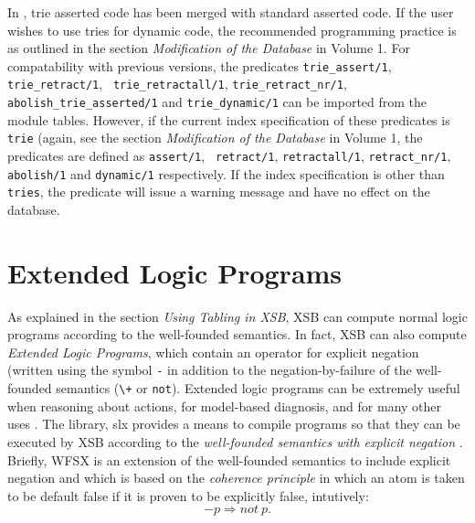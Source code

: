 In \version, trie asserted code has been merged with standard asserted
code.  If the user wishes to use tries for dynamic code, the
recommended programming practice is as outlined in the section {\it
Modification of the Database} in Volume 1.
For compatability with previous versions, the
predicates {\tt trie\_assert/1}, {\tt trie\_retract/1}, {\tt
trie\_retractall/1}, {\tt trie\_retract\_nr/1}, {\tt
abolish\_trie\_asserted/1} and {\tt trie\_dynamic/1} can be imported
from the module {\sf tables}.  However, if the current index
specification of these predicates is {\tt trie} (again, see the
section {\it Modification of the Database} in Volume 1, the predicates
are defined as {\tt assert/1}, {\tt 
retract/1}, {\tt retractall/1}, {\tt retract\_nr/1}, {\tt abolish/1}
and {\tt dynamic/1} respectively.  If the index specification is other
than {\tt tries}, the predicate will issue a warning message and have
no effect on the database.

\section{Extended Logic Programs}  \label{library_utilities:wfsx}
As explained in the section {\it Using Tabling in XSB}, XSB can
compute normal logic programs according to the well-founded semantics.
In fact, XSB 
can also compute {\em Extended Logic Programs}, which contain an
operator for explicit negation (written using the symbol {\tt -} in
addition to the negation-by-failure of the well-founded semantics
(\verb|\+| or {\tt not}).  Extended logic programs can be extremely
useful when reasoning about actions, for model-based diagnosis, and
for many other uses \cite{AlPe95}.  The library, {\sf slx} provides a means
to compile programs so that they can be executed by XSB according to
the {\em well-founded semantics with explicit negation} \cite{ADP95}.
Briefly, WFSX is an extension of the well-founded semantics to include
explicit negation and which is based on the {\em coherence principle}
in which an atom is taken to be default false if it is proven to be
explicitly false, intutively:
\[
-p \Rightarrow not\ p.
\]

